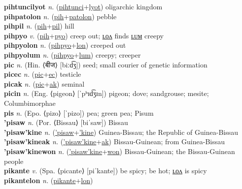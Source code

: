 \textbf{pihtuncilyot} \textit{n.} (\hyperref[pihtunci]{pihtunci}+\hyperref[lyot]{lyot})
oligarchic kingdom \label{pihtuncilyot} \\
\textbf{pihpatolon} \textit{n.} (\hyperref[pih]{pih}+\hyperref[patolon]{patolon})
pebble \label{pihpatolon} \\
\textbf{pihpil} \textit{n.} (\hyperref[pih]{pih}+\hyperref[pil]{pil})
hill \label{pihpil} \\
\textbf{pihpyo} \textit{v.} (\hyperref[pih]{pih}+\hyperref[pyo]{pyo})
creep out; \hyperref[pihpyolon]{ʟᴏᴧ} finds \hyperref[pihpyolum]{ʟᴜᴍ} creepy \label{pihpyo} \\
\textbf{pihpyolon} \textit{n.} (\hyperref[pihpyo]{pihpyo}+\hyperref[lon]{lon})
creeped out \label{pihpyolon} \\
\textbf{pihpyolum} \textit{n.} (\hyperref[pihpyo]{pihpyo}+\hyperref[lum]{lum})
creepy; creeper \label{pihpyolum} \\
\textbf{pic} \textit{n.} (Hin. ⟨बीज⟩ [biːd͡ʒ])
seed; small courier of genetic information \label{pic} \\
\textbf{picec} \textit{n.} (\hyperref[pic]{pic}+\hyperref[ec]{ec})
testicle \label{picec} \\
\textbf{picak} \textit{n.} (\hyperref[pic]{pic}+\hyperref[ak]{ak})
seminal \label{picak} \\
\textbf{picin} \textit{n.} (Eng. ⟨pigeon⟩ [ˈpʰɪd͡ʒɪn])
pigeon; dove; sandgrouse; mesite; Columbimorphae \label{picin} \\
\textbf{pis} \textit{n.} (Epo. ⟨pizo⟩ [ˈpizo])
pea; green pea; Pisum \label{pis} \\
\textbf{'pisaw} \textit{n.} (Por. ⟨Bissau⟩ [biˈsaw])
Bissau \label{'pisaw} \\
\textbf{'pisaw'kine} \textit{n.} (\hyperref['pisaw]{'pisaw}+\hyperref['kine]{'kine})
Guinea-Bissau; the Republic of Guinea-Bissau \label{'pisaw'kine} \\
\textbf{'pisaw'kineak} \textit{n.} (\hyperref['pisaw'kine]{'pisaw'kine}+\hyperref[ak]{ak})
Bissau-Guinean; from Guinea-Bissau \label{'pisaw'kineak} \\
\textbf{'pisaw'kinewon} \textit{n.} (\hyperref['pisaw'kine]{'pisaw'kine}+\hyperref[won]{won})
Bissau-Guinean; the Bissau-Guinean people \label{'pisaw'kinewon} \\
\textbf{pikante} \textit{v.} (Spa. ⟨picante⟩ [piˈkante])
be spicy; be hot; \hyperref[pikantelon]{ʟᴏᴧ} is spicy \label{pikante} \\
\textbf{pikantelon} \textit{n.} (\hyperref[pikante]{pikante}+\hyperref[lon]{lon})
